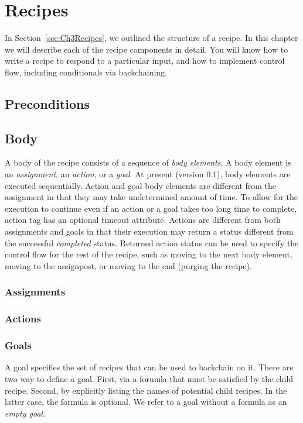 \chapter{Recipes}
\label{Chapter4}

In Section~\ref{sec:Ch3Recipes}, we outlined the structure of a recipe. In this chapter we will describe each of the recipe components in detail. You will know how to write a recipe to respond to a particular input, and how to implement control flow, including conditionals via backchaining.



\section{Preconditions}
\section{Body}

A body of the recipe consists of a sequence of \textsl{body elements}. A body element is an \textsl{assignment}, an \textsl{action}, or a \textsl{goal}. At present (version 0.1), body elements are executed sequentially. Action and goal body elements are different from the assignment in that they may take undetermined amount of time. To allow for the execution to continue even if an action or a goal takes too long time to complete, action tag has an optional timeout attribute. Actions are different from both assignments and goals in that their execution may return a status different from the successful \textsl{completed} status. Returned action status can be used to specify the control flow for the rest of the recipe, such as moving to the next body element, moving to the assignpost, or moving to the end (purging the recipe).

\subsection{Assignments}
\subsection{Actions}
\subsection{Goals}

A goal specifies the set of recipes that can be used to backchain on it. There are two way to define a goal. First, via a formula that must be satisfied by the child recipe. Second, by explicitly listing the names of potential child recipes. In the latter case, the formula is optional. We refer to a goal without a formula as an \textsl{empty goal}.

